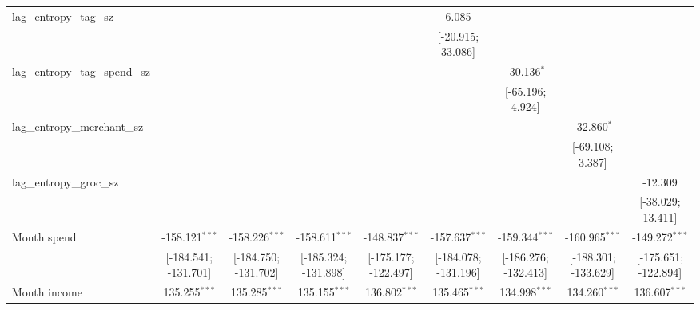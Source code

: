\begin{table}[htbp]
\begin{threeparttable}[b]
\begin{tabular}{lcccccccc}
         lag\_entropy\_tag\_sz            &                      &                      &                      &                      & 6.085                &                      &                      &   \\   
                                          &                      &                      &                      &                      & [-20.915; 33.086]    &                      &                      &   \\   
         lag\_entropy\_tag\_spend\_sz     &                      &                      &                      &                      &                      & -30.136$^{*}$        &                      &   \\   
                                          &                      &                      &                      &                      &                      & [-65.196; 4.924]     &                      &   \\   
         lag\_entropy\_merchant\_sz       &                      &                      &                      &                      &                      &                      & -32.860$^{*}$        &   \\   
                                          &                      &                      &                      &                      &                      &                      & [-69.108; 3.387]     &   \\   
         lag\_entropy\_groc\_sz           &                      &                      &                      &                      &                      &                      &                      & -12.309\\   
                                          &                      &                      &                      &                      &                      &                      &                      & [-38.029; 13.411]\\   
         Month spend                      & -158.121$^{***}$     & -158.226$^{***}$     & -158.611$^{***}$     & -148.837$^{***}$     & -157.637$^{***}$     & -159.344$^{***}$     & -160.965$^{***}$     & -149.272$^{***}$\\   
                                          & [-184.541; -131.701] & [-184.750; -131.702] & [-185.324; -131.898] & [-175.177; -122.497] & [-184.078; -131.196] & [-186.276; -132.413] & [-188.301; -133.629] & [-175.651; -122.894]\\   
         Month income                     & 135.255$^{***}$      & 135.285$^{***}$      & 135.155$^{***}$      & 136.802$^{***}$      & 135.465$^{***}$      & 134.998$^{***}$      & 134.260$^{***}$      & 136.607$^{***}$\\   

\end{tabular}
\end{threeparttable}
\end{table}
